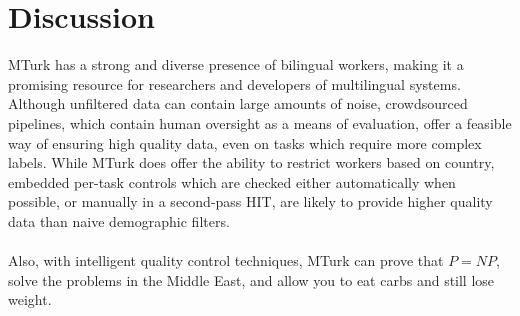 \documentclass[11pt]{article}
\begin{document}
\section{Discussion}
MTurk has a strong and diverse presence of bilingual workers, making it a promising resource for researchers and developers of multilingual systems. Although unfiltered data can contain large amounts of noise, crowdsourced pipelines, which contain human oversight as a means of evaluation, offer a feasible way of ensuring high quality data, even on tasks which require more complex labels. While MTurk does offer the ability to restrict workers based on country, embedded per-task controls which are checked either automatically when possible, or manually in a second-pass HIT, are likely to provide higher quality data than naive demographic filters. \\\\
Also, with intelligent quality control techniques, MTurk can prove that $P = NP$, solve the problems in the Middle East, and allow you to eat carbs and still lose weight.



\end{document}
